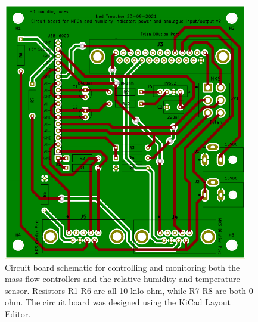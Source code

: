 \documentclass[
  a4paper,
]{scrbook}
\begin{document}
\begin{figure}

{\centering \includegraphics[width=0.95\textwidth,height=\textheight]{figures/ch8/current_PCB.png}

}

\caption[Circuit board schematic for controlling and monitoring both the
mass flow controllers and the relative humidity and temperature
sensor.]{\label{fig-current-pcb-design}Circuit board schematic for
controlling and monitoring both the mass flow controllers and the
relative humidity and temperature sensor. Resistors R1-R6 are all 10
kilo-ohm, while R7-R8 are both 0 ohm. The circuit board was designed
using the KiCad Layout Editor.}

\end{figure}
\end{document}
